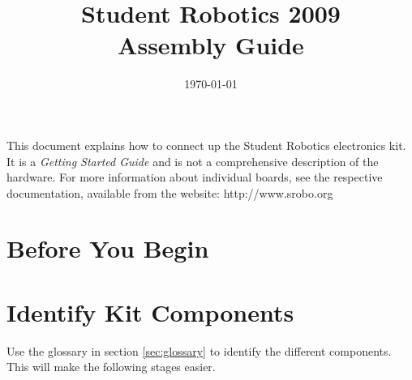 \documentclass[a4paper, 12pt]{article}
\title {Student Robotics 2009\\ Assembly Guide}
\date{\today}
\begin{document}
\maketitle

\noindent This document explains how to connect up the Student Robotics electronics kit. It is a \textit{Getting Started Guide} and is not a comprehensive description of the hardware. For more information about individual boards, see the respective documentation, available from the website: http://www.srobo.org 

\section{Before You Begin}

\section{Identify Kit Components}
Use the glossary in section \ref{sec:glossary} to identify the different components. This will make the following stages easier.

\newpage

\end{document}
